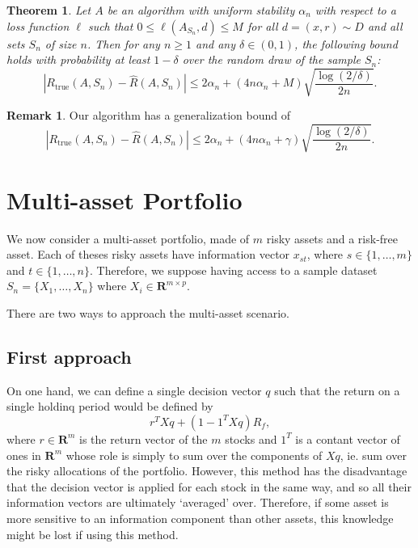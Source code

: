 \documentclass[11pt]{article}
\newcommand{\real}{\bm R}
\theoremstyle{plain}
\newtheorem{thm}{Theorem}
\theoremstyle{definition}
\newtheorem*{rem}{Remark}
\begin{document}
\begin{thm}
  Let $A$ be an algorithm with uniform stability $\alpha_n$ with respect to a loss
  function $\ell$ such that $0\leq\ell(A_{S_n},d)\leq M$ for all $d=(x,r)\sim D$ and all sets
  $S_n$ of size $n$. Then for any $n\geq1$ and any $\delta\in(0,1)$, the following bound
  holds with probability at least $1-\delta$ over the random draw of the sample $S_n$:
  \begin{equation}
    |R_{\text{true}}(A,S_n) - \hat R(A,S_n)| \leq 2\alpha_n + (4n\alpha_n + M) \sqrt{\frac{\log(2/\delta)}{2n}}.
  \end{equation}
\end{thm}

\begin{rem}
  Our algorithm has a generalization bound of
  \begin{equation}
    |R_{\text{true}}(A,S_n) - \hat R(A,S_n)| \leq 2\alpha_n + (4n\alpha_n + \gamma) \sqrt{\frac{\log(2/\delta)}{2n}}.
  \end{equation}
\end{rem}


\section{Multi-asset Portfolio}

We now consider a multi-asset portfolio, made of $m$ risky assets and a risk-free
asset. Each of theses risky assets have information vector $x_{st}$, where
$s\in\{1,\ldots,m\}$ and $t\in\{1,\ldots,n\}$. Therefore, we suppose having access to a
sample dataset $S_n = \{X_1,\ldots,X_n\}$ where $X_i\in\real^{m\times p}$.

There are two ways to approach the multi-asset scenario. 


\subsection{First approach}

On one hand, we can define a single decision vector $q$ such that the return on a single
holdinq period would be defined by
\begin{equation}
  r^{T}Xq + (1 - 1^{T}Xq)R_f,
\end{equation}
where $r\in\real^{m}$ is the return vector of the $m$ stocks and $1^T$ is a contant vector
of ones in $\real^m$ whose role is simply to sum over the components of $Xq$, ie. sum over
the risky allocations of the portfolio. However, this method has the disadvantage that the
decision vector is applied for each stock in the same way, and so all their information
vectors are ultimately `averaged' over. Therefore, if some asset is more sensitive to an
information component than other assets, this knowledge might be lost if using this
method. 
\end{document}

